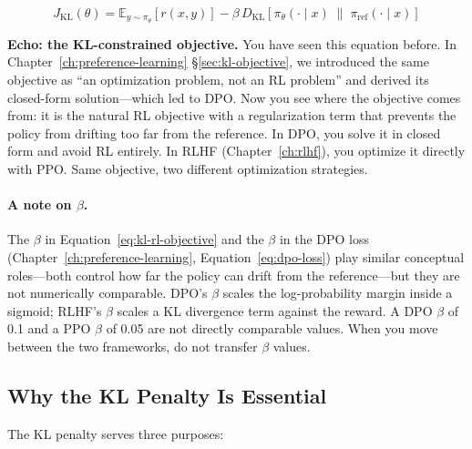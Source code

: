 \begin{equation}
\label{eq:kl-rl-objective}
J_{\text{KL}}(\theta) = \mathbb{E}_{y \sim \pi_\theta}\!\left[r(x, y)\right] - \beta \, D_{\text{KL}}\!\left[\pi_\theta(\cdot \mid x) \;\|\; \pi_{\text{ref}}(\cdot \mid x)\right]
\end{equation}

\begin{tcolorbox}[colback=gray!8, colframe=gray!40]
\textbf{Echo: the KL-constrained objective.} You have seen this equation before. In Chapter~\ref{ch:preference-learning} \S\ref{sec:kl-objective}, we introduced the same objective as ``an optimization problem, not an RL problem'' and derived its closed-form solution---which led to DPO. Now you see where the objective comes from: it is the natural RL objective with a regularization term that prevents the policy from drifting too far from the reference. In DPO, you solve it in closed form and avoid RL entirely. In RLHF (Chapter~\ref{ch:rlhf}), you optimize it directly with PPO. Same objective, two different optimization strategies.
\end{tcolorbox}

\paragraph{A note on $\beta$.} The $\beta$ in Equation~\ref{eq:kl-rl-objective} and the $\beta$ in the DPO loss (Chapter~\ref{ch:preference-learning}, Equation~\ref{eq:dpo-loss}) play similar conceptual roles---both control how far the policy can drift from the reference---but they are not numerically comparable. DPO's $\beta$ scales the log-probability margin inside a sigmoid; RLHF's $\beta$ scales a KL divergence term against the reward. A DPO $\beta$ of 0.1 and a PPO $\beta$ of 0.05 are not directly comparable values. When you move between the two frameworks, do not transfer $\beta$ values.

\subsection{Why the KL Penalty Is Essential}

The KL penalty serves three purposes:


